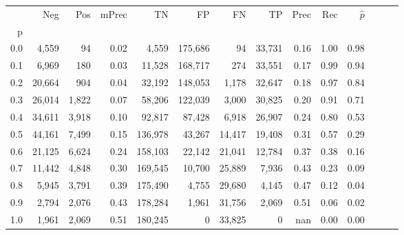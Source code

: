\begin{tabular}{rrrrrrrrrrrrrr}
\toprule
{} &     Neg &    Pos & mPrec &       TN &       FP &      FN &      TP &  Prec &   Rec & $\hat{p}$ \\
p   &         &        &       &          &          &         &         &       &       &           \\
\midrule
0.0 &   4,559 &     94 &  0.02 &    4,559 &  175,686 &      94 &  33,731 &  0.16 &  1.00 &      0.98 \\
0.1 &   6,969 &    180 &  0.03 &   11,528 &  168,717 &     274 &  33,551 &  0.17 &  0.99 &      0.94 \\
0.2 &  20,664 &    904 &  0.04 &   32,192 &  148,053 &   1,178 &  32,647 &  0.18 &  0.97 &      0.84 \\
0.3 &  26,014 &  1,822 &  0.07 &   58,206 &  122,039 &   3,000 &  30,825 &  0.20 &  0.91 &      0.71 \\
0.4 &  34,611 &  3,918 &  0.10 &   92,817 &   87,428 &   6,918 &  26,907 &  0.24 &  0.80 &      0.53 \\
0.5 &  44,161 &  7,499 &  0.15 &  136,978 &   43,267 &  14,417 &  19,408 &  0.31 &  0.57 &      0.29 \\
0.6 &  21,125 &  6,624 &  0.24 &  158,103 &   22,142 &  21,041 &  12,784 &  0.37 &  0.38 &      0.16 \\
0.7 &  11,442 &  4,848 &  0.30 &  169,545 &   10,700 &  25,889 &   7,936 &  0.43 &  0.23 &      0.09 \\
0.8 &   5,945 &  3,791 &  0.39 &  175,490 &    4,755 &  29,680 &   4,145 &  0.47 &  0.12 &      0.04 \\
0.9 &   2,794 &  2,076 &  0.43 &  178,284 &    1,961 &  31,756 &   2,069 &  0.51 &  0.06 &      0.02 \\
1.0 &   1,961 &  2,069 &  0.51 &  180,245 &        0 &  33,825 &       0 &   nan &  0.00 &      0.00 \\
\bottomrule
\end{tabular}
